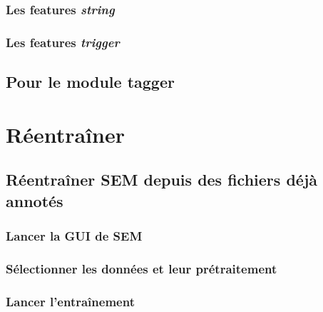 \documentclass[12pt]{article}
\begin{document}
            \subsubsection{Les features \textit{string}}
            \label{subsubsec:feature-string}
            

            \subsubsection{Les features \textit{trigger}}
            \label{subsubsec:feature-triggered}
            

        \subsection{Pour le module tagger}
        \label{sec:config-tagger}
        
    
    \section{Réentraîner \SEM}
    \label{sec:retrain-sem}
    
    
        \subsection{Réentraîner SEM depuis des fichiers déjà annotés}
        \label{subsec:retrain-sem-annotated}
        
            \subsubsection{Lancer la GUI de SEM}
            \label{subsec:launch-sem-gui}
            
            
            \subsubsection{Sélectionner les données et leur prétraitement}
            \label{subsec:data-and-preprocess}
            
            
            \subsubsection{Lancer l'entraînement}
            \label{subsubsec:train-SEM-from-annotated}
            
        
\end{document}
